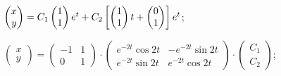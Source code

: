 \begin{enumsolsfull}
		\item \( \begin{pmatrix} x \\ y \end{pmatrix} = C_1 \begin{pmatrix} 1 \\ 1 \end{pmatrix} e^{t} + C_2 \left[ \begin{pmatrix} 1 \\ 1 \end{pmatrix}t + \begin{pmatrix} 0 \\ 1 \end{pmatrix} \right] e^{t} \); %
		\item \( \begin{pmatrix} x \\ y \end{pmatrix} = \begin{pmatrix} -1 & 1 \\ 0 & 1 \end{pmatrix} \cdot \begin{pmatrix} e^{-2t} \cos{2t} & -e^{-2t} \sin{2t} \\ e^{-2t} \sin{2t} & e^{-2t} \cos{2t} \end{pmatrix} \cdot \begin{pmatrix} C_1 \\ C_2 \end{pmatrix} \); %

\end{enumsolsfull}
